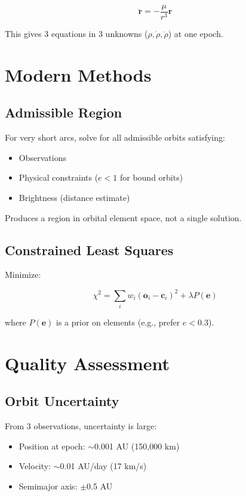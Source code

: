 \begin{equation}
    \ddot{\mathbf{r}} = -\frac{\mu}{r^3}\mathbf{r}
\end{equation}

This gives 3 equations in 3 unknowns ($\rho, \dot{\rho}, \ddot{\rho}$) at one epoch.

\section{Modern Methods}

\subsection{Admissible Region}

For very short arcs, solve for all admissible orbits satisfying:
\begin{itemize}
    \item Observations
    \item Physical constraints ($e < 1$ for bound orbits)
    \item Brightness (distance estimate)
\end{itemize}

Produces a region in orbital element space, not a single solution.

\subsection{Constrained Least Squares}

Minimize:

\begin{equation}
    \chi^2 = \sum_i w_i(\mathbf{o}_i - \mathbf{c}_i)^2 + \lambda P(\mathbf{e})
\end{equation}

where $P(\mathbf{e})$ is a prior on elements (e.g., prefer $e < 0.3$).

\section{Quality Assessment}

\subsection{Orbit Uncertainty}

From 3 observations, uncertainty is large:
\begin{itemize}
    \item Position at epoch: $\sim$0.001 AU (150,000 km)
    \item Velocity: $\sim$0.01 AU/day (17 km/s)
    \item Semimajor axis: $\pm$0.5 AU
\end{itemize}


